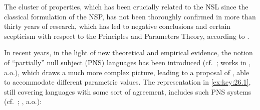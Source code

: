 \documentclass[output=paper]{langsci/langscibook}
\begin{document}
The cluster of properties, which has been crucially related to the \gls{NSL}
since the classical formulation of the \gls{NSP}, has not been thoroughly
confirmed in more than thirty years of research, which has led to negative
conclusions and certain scepticism with respect to the Principles and
Parameters Theory, according to \citet{RobHol2010}.

 In recent years, in the light of new theoretical and empirical
evidence, the notion of “partially” null subject (\gls{PNS}) languages has been
introduced (cf.\ \citealt{Holmberg2005}; works in
\citealt{Biberauer2008,BibHolRobShee2010}, a.o.), which draws a much more
complex picture, leading to a proposal of , able to
accommodate different parametric values. The representation in \eqref{ex:key:26.1},
still covering languages with some sort of agreement, includes such \gls{PNS}
systems (cf.\ \citealt{HolShee2010}; \citealt[6]{Sheehan2014b}, a.o.):

\ea%
    \label{ex:key:26.1}
    \hspace*{-1.0cm}
\z
\end{document}
